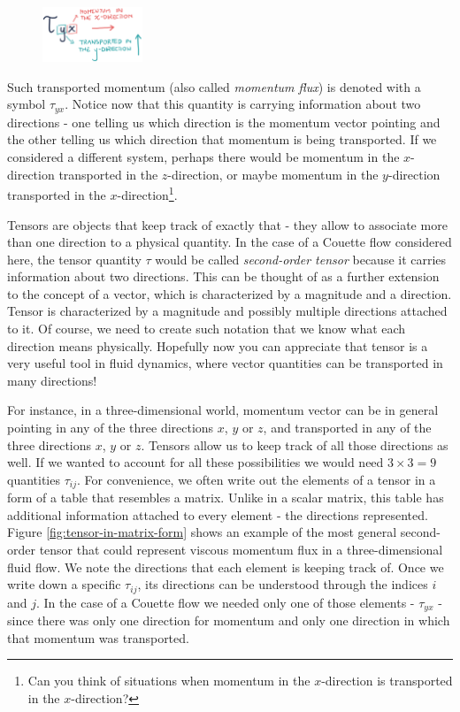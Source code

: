 \documentclass[10pt,twocolumn]{article}
\begin{document}
\begin{figure}
\centering\includegraphics[width=3cm]{tau_y_x.png}
\label{fig:tau_y_x}
\end{figure}
Such transported momentum (also called \textit{momentum flux}) is denoted with a symbol $\tau_{yx}$. Notice now that this quantity is carrying information about two directions - one telling us which direction is the momentum vector pointing and the other telling us which direction that momentum is being transported. If we considered a different system, perhaps there would be momentum in the $x$-direction transported in the $z$-direction, or maybe momentum in the $y$-direction transported in the $x$-direction\footnote{Can you think of situations when momentum in the $x$-direction is transported in the $x$-direction?}.

Tensors are objects that keep track of exactly that - they allow to associate more than one direction to a physical quantity. In the case of a Couette flow considered here, the tensor quantity $\tau$ would be called \textit{second-order tensor} because it carries information about two directions. This can be thought of as a further extension to the concept of a vector, which is characterized by a magnitude and a direction. Tensor is characterized by a magnitude and possibly multiple directions attached to it. Of course, we need to create such notation that we know what each direction means physically. Hopefully now you can appreciate that tensor is a very useful tool in fluid dynamics, where vector quantities can be transported in many directions!

For instance, in a three-dimensional world, momentum vector can be in general pointing in any of the three directions $x$, $y$ or $z$, and transported in any of the three directions $x$, $y$ or $z$. Tensors allow us to keep track of all those directions as well. If we wanted to account for all these possibilities we would need $3 \times 3 = 9$ quantities $\tau_{ij}$. For convenience, we often write out the elements of a tensor in a form of a table that resembles a matrix. Unlike in a scalar matrix, this table has additional information attached to every element - the directions represented. Figure \ref{fig:tensor-in-matrix-form} shows an example of the most general second-order tensor that could represent viscous momentum flux in a three-dimensional fluid flow. We note the directions that each element is keeping track of. Once we write down a specific $\tau_{ij}$, its directions can be understood through the indices $i$ and $j$. In the case of a Couette flow we needed only one of those elements - $\tau_{yx}$ - since there was only one direction for momentum and only one direction in which that momentum was transported.
\end{document}
